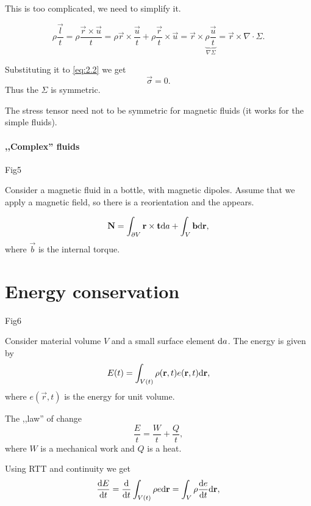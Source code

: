 \documentclass[11pt,oneside]{book}
\theoremstyle{definition} %
\theoremstyle{plain} %
\theoremstyle{remark} %
\theoremstyle{underline}
\begin{document}
  This is too complicated, we need to simplify it.
  
  \begin{displaymath}
    \rho \dfrac{ \vec l }{t} = \rho \dfrac{\vec r \times \vec u}{t} 
    = \rho \vec r \times \dfrac{\vec u}{t} + \rho \dfrac{ \vec r }{t} \times \vec u
    = \vec r \times \underbrace{\rho \dfrac{\vec u}{t}}_{\nabla \Sigma} 
    = \vec r \times \nabla \cdot \Sigma.
  \end{displaymath}

  Substituting it to  \ref{eq:2.2} we get
  \begin{displaymath}
    \vec \sigma = 0.
  \end{displaymath}
  Thus the $\Sigma $ is symmetric.

  The stress tensor need not to be symmetric for magnetic fluids (it works for the simple fluids).


  \paragraph{,,Complex'' fluids}
  \todo Fig5

  Consider a magnetic fluid in a bottle, with magnetic dipoles.
  Assume that we apply a magnetic field, so there is a reorientation and the  appears.
  
  \begin{displaymath}
    \mathbf{N} = \int_{\partial V} \mathbf{r} \times \mathbf{t} \mathrm{d} a + \int_{V} \mathbf{b} \mathrm{d} \mathbf{r},
  \end{displaymath}
  where $\vec b$ is the internal torque.
  
  
  \section{Energy conservation}
  \todo Fig6 

  Consider material volume $V$ and a small surface element $\mathrm{d} a$.
  The energy is given by 
  \begin{displaymath}
    E(t) = \int_{V (t)} \rho (\mathbf{r} ,t ) e (\mathbf{r}, t) \mathrm{d} \mathbf{r} ,
  \end{displaymath}
  where $e (\vec r, t)$ is the energy for unit volume.

  The ,,law'' of change
  \begin{displaymath}
    \dfrac{E}{t} = \dfrac{W}{t} + \dfrac{Q}{t},
  \end{displaymath}
  where $W$ is a mechanical work and $Q$ is a heat.

  Using RTT and continuity we get
  \begin{displaymath}
    \frac{\mathrm{d} E}{\mathrm{d} t} = \frac{\mathrm{d} }{\mathrm{d} t} \int_{V(t)} \rho e \mathrm{d} \mathbf{r} = \int_V \rho \frac{\mathrm{d} e}{\mathrm{d} t} \mathrm{d} \mathbf{r},
  \end{displaymath}
  
\end{document}
